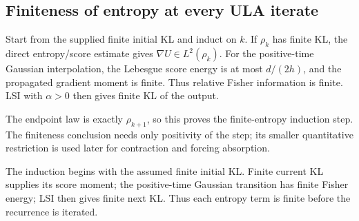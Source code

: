 \documentclass[11pt,a4paper]{report}
\begin{document}
\subsection{\texorpdfstring{Finiteness of entropy at every ULA iterate}{Finiteness of entropy at every ULA iterate}}
\label{report-step-UnadjustedLangevin-LSI-UnconditionalTheorem-lean-2}


Start from the supplied finite initial KL and induct on \(k\). If \(\rho_k\) has finite KL, the direct entropy/\allowbreak{}score estimate gives \(\nabla U\in L^2(\rho_k)\). For the positive-time Gaussian interpolation, the Lebesgue score energy is at most \(d/(2h)\), and the propagated gradient moment is finite. Thus relative Fisher information is finite. LSI with \(\alpha>0\) then gives finite KL of the output.



The endpoint law is exactly \(\rho_{k+1}\), so this proves the finite-entropy induction step. The finiteness conclusion needs only positivity of the step; its smaller quantitative restriction is used later for contraction and forcing absorption.



The induction begins with the assumed finite initial KL. Finite current KL supplies its score moment; the positive-time Gaussian transition has finite Fisher energy; LSI then gives finite next KL. Thus each entropy term is finite before the recurrence is iterated.
\end{document}
